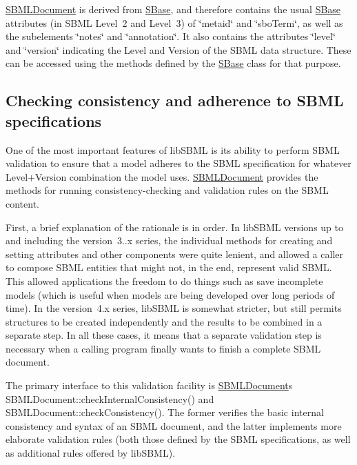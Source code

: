 \hyperlink{class_s_b_m_l_document}{S\+B\+M\+L\+Document} is derived from \hyperlink{class_s_base}{S\+Base}, and therefore contains the usual \hyperlink{class_s_base}{S\+Base} attributes (in S\+B\+ML Level~2 and Level~3) of \char`\"{}metaid\char`\"{} and \char`\"{}sbo\+Term\char`\"{}, as well as the subelements \char`\"{}notes\char`\"{} and \char`\"{}annotation\char`\"{}. It also contains the attributes \char`\"{}level\char`\"{} and \char`\"{}version\char`\"{} indicating the Level and Version of the S\+B\+ML data structure. These can be accessed using the methods defined by the \hyperlink{class_s_base}{S\+Base} class for that purpose.\hypertarget{class_s_b_m_l_document_checking}{}\subsection{Checking consistency and adherence to S\+B\+M\+L specifications}\label{class_s_b_m_l_document_checking}
One of the most important features of lib\+S\+B\+ML is its ability to perform S\+B\+ML validation to ensure that a model adheres to the S\+B\+ML specification for whatever Level+\+Version combination the model uses. \hyperlink{class_s_b_m_l_document}{S\+B\+M\+L\+Document} provides the methods for running consistency-\/checking and validation rules on the S\+B\+ML content.

First, a brief explanation of the rationale is in order. In lib\+S\+B\+ML versions up to and including the version~3..\+x series, the individual methods for creating and setting attributes and other components were quite lenient, and allowed a caller to compose S\+B\+ML entities that might not, in the end, represent valid S\+B\+ML. This allowed applications the freedom to do things such as save incomplete models (which is useful when models are being developed over long periods of time). In the version~4.\+x series, lib\+S\+B\+ML is somewhat stricter, but still permits structures to be created independently and the results to be combined in a separate step. In all these cases, it means that a separate validation step is necessary when a calling program finally wants to finish a complete S\+B\+ML document.

The primary interface to this validation facility is \hyperlink{class_s_b_m_l_document}{S\+B\+M\+L\+Document}\textquotesingle{}s S\+B\+M\+L\+Document\+::check\+Internal\+Consistency() and S\+B\+M\+L\+Document\+::check\+Consistency(). The former verifies the basic internal consistency and syntax of an S\+B\+ML document, and the latter implements more elaborate validation rules (both those defined by the S\+B\+ML specifications, as well as additional rules offered by lib\+S\+B\+ML).

